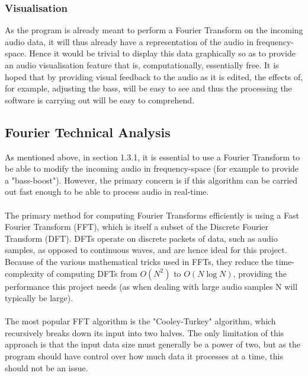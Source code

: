 \documentclass{article}
\begin{document}
	\subsubsection{Visualisation}
	As the program is already meant to perform a Fourier Transform on the incoming audio data, it will thus already have a representation of the audio in frequency-space. Hence it would be trivial to display this data graphically so as to provide an audio visualisation feature that is, computationally, essentially free. It is hoped that by providing visual feedback to the audio as it is edited, the effects of, for example, adjusting the bass, will be easy to see and thus the processing the software is carrying out will be easy to comprehend. 
	
	\subsection{Fourier Technical Analysis}
	As mentioned above, in section 1.3.1, it is essential to use a Fourier Transform to be able to modify the incoming audio in frequency-space (for example to provide a "bass-boost"). However, the primary concern is if this algorithm can be carried out fast enough to be able to process audio in real-time.
	
	\paragraph{}
	The primary method for computing Fourier Transforms efficiently is using a Fast Fourier Transform (FFT), which is itself a subset of the Discrete Fourier Transform (DFT). DFTs operate on discrete packets of data, such as audio samples, as opposed to continuous waves, and are hence ideal for this project. Because of the various mathematical tricks used in FFTs, they reduce the time-complexity of computing DFTs from \(O(N^2)\) to \(O(N\log{N})\), providing the performance this project needs (as when dealing with large audio samples N will typically be large).
	
	\paragraph{}
	The most popular FFT algorithm is the "Cooley-Turkey" algorithm, which recursively breaks down its input into two halves. The only limitation of  this approach is that the input data size must generally be a power of two, but as the program should have control over how much data it processes at a time, this should not be an issue.
	
\end{document}
